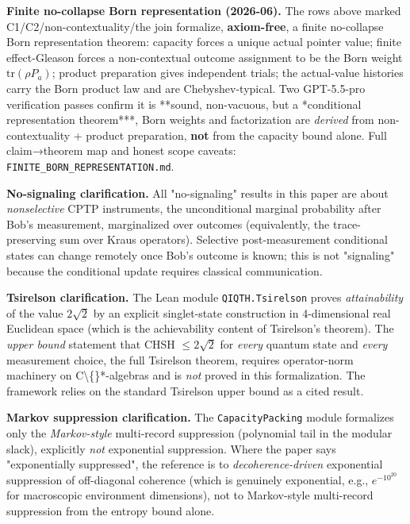 \documentclass[11pt,a4paper]{article}
\begin{document}
\textbf{Finite no-collapse Born representation (2026-06).} The rows above marked C1/C2/non-contextuality/the
join formalize, \textbf{axiom-free}, a finite no-collapse Born representation theorem: capacity forces a
unique actual pointer value; finite effect-Gleason forces a non-contextual outcome assignment to be the
Born weight $\mathrm{tr}(\rho P_a)$; product preparation gives independent trials; the actual-value
histories carry the Born product law and are Chebyshev-typical. Two GPT-5.5-pro verification passes
confirm it is **sound, non-vacuous, but a *conditional representation theorem***, Born weights and
factorization are \emph{derived} from non-contextuality + product preparation, \textbf{not} from the capacity
bound alone. Full claim→theorem map and honest scope caveats: \texttt{FINITE\_BORN\_REPRESENTATION.md}.

\textbf{No-signaling clarification.} All "no-signaling" results in this paper are about \emph{nonselective} CPTP instruments, the unconditional marginal probability after Bob's measurement, marginalized over outcomes (equivalently, the trace-preserving sum over Kraus operators). Selective post-measurement conditional states can change remotely once Bob's outcome is known; this is not "signaling" because the conditional update requires classical communication.

\textbf{Tsirelson clarification.} The Lean module \texttt{QIQTH.Tsirelson} proves \emph{attainability} of the value $2\sqrt{2}$ by an explicit singlet-state construction in 4-dimensional real Euclidean space (which is the achievability content of Tsirelson's theorem). The \emph{upper bound} statement that CHSH $\le 2\sqrt{2}$ for \emph{every} quantum state and \emph{every} measurement choice, the full Tsirelson theorem, requires operator-norm machinery on C\textbackslash\{\}*-algebras and is \emph{not} proved in this formalization. The framework relies on the standard Tsirelson upper bound as a cited result.

\textbf{Markov suppression clarification.} The \texttt{CapacityPacking} module formalizes only the \emph{Markov-style} multi-record suppression (polynomial tail in the modular slack), explicitly \emph{not} exponential suppression. Where the paper says "exponentially suppressed", the reference is to \emph{decoherence-driven} exponential suppression of off-diagonal coherence (which is genuinely exponential, e.g., $e^{-10^{20}}$ for macroscopic environment dimensions), not to Markov-style multi-record suppression from the entropy bound alone.
\end{document}
